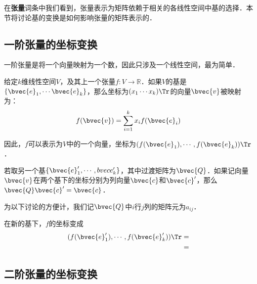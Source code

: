

在\textbf{张量}词条中我们看到，张量表示为矩阵依赖于相关的各线性空间中基的选择．本节将讨论基的变换是如何影响张量的矩阵表示的．

\subsection{一阶张量的坐标变换}
一阶张量是将一个向量映射为一个数，因此只涉及一个线性空间，最为简单．

给定$k$维线性空间$V$，及其上一个张量$f:V\rightarrow\mathbb{R}$．如果$V$的基是$\{\bvec{e}_1, \cdots\bvec{e}_k\}$，那么坐标为$(x_1\cdots x_k)\Tr$的向量$\bvec{v}$被映射为：
\begin{equation}
f(\bvec{v})=\sum\limits_{i=1}^k x_if(\bvec{e}_i)
\end{equation}

因此，$f$可以表示为$V$中的一个向量，坐标为$(f(\bvec{e}_1), \cdots, f(\bvec{e}_k))\Tr$．

若取另一个基$\{\bvec{e}_1', \cdots, \\bvec{e}_k'\}$，其中过渡矩阵为$\bvec{Q}$．如果记向量$\bvec{v}$在两个基下的坐标分别为列向量$\bvec{c}$和$\bvec{c}'$，那么$\bvec{Q}\bvec{c}'=\bvec{c}$．

为以下讨论的方便计，我们记$\bvec{Q}$中$i$行$j$列的矩阵元为$a_{ij}$．

在新的基下，$f$的坐标变成
\begin{equation}
\begin{aligned}
(f(\bvec{e}_1'), \cdots, f(\bvec{e}_k'))\Tr&=\\&=
\end{aligned}
\end{equation}




\subsection{二阶张量的坐标变换}




